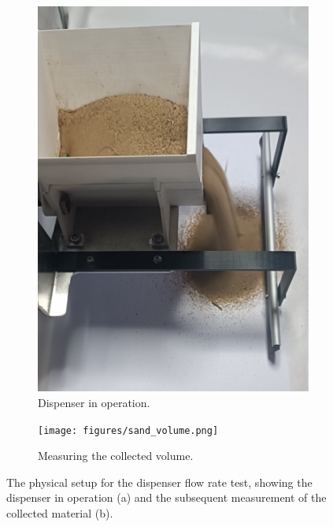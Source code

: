 \begin{figure}[h!]
    \centering
    \begin{subfigure}[b]{0.49\textwidth}
        \centering
        \includegraphics[width=\textwidth]{figures/sand_dispensing.png}
        \caption{Dispenser in operation.}
        \label{fig:dispenser_action}
    \end{subfigure}
    \hfill
    \begin{subfigure}[b]{0.49\textwidth}
        \centering
        \texttt{[image: figures/sand\_volume.png]}
        \caption{Measuring the collected volume.}
        \label{fig:dispensed_volume}
    \end{subfigure}
    \caption[Experimental Setup for the Dispenser Test.]
    {The physical setup for the dispenser flow rate test, showing the dispenser in operation (a) and the subsequent measurement of the collected material (b).}
    \label{fig:dispenser_test}
\end{figure}

